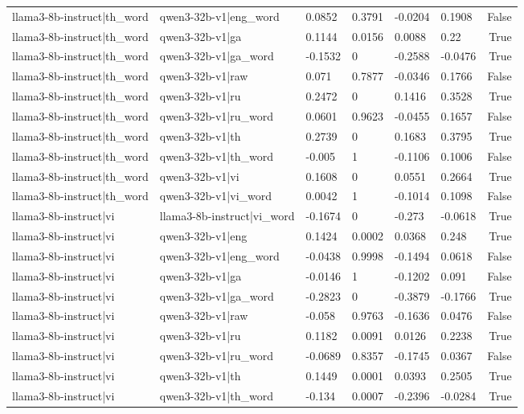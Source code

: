 \begin{table}
\begin{tabular}{llllllr}
llama3-8b-instruct|th_word & qwen3-32b-v1|eng_word & 0.0852 & 0.3791 & -0.0204 & 0.1908 & False \\
llama3-8b-instruct|th_word & qwen3-32b-v1|ga & 0.1144 & 0.0156 & 0.0088 & 0.22 & True \\
llama3-8b-instruct|th_word & qwen3-32b-v1|ga_word & -0.1532 & 0 & -0.2588 & -0.0476 & True \\
llama3-8b-instruct|th_word & qwen3-32b-v1|raw & 0.071 & 0.7877 & -0.0346 & 0.1766 & False \\
llama3-8b-instruct|th_word & qwen3-32b-v1|ru & 0.2472 & 0 & 0.1416 & 0.3528 & True \\
llama3-8b-instruct|th_word & qwen3-32b-v1|ru_word & 0.0601 & 0.9623 & -0.0455 & 0.1657 & False \\
llama3-8b-instruct|th_word & qwen3-32b-v1|th & 0.2739 & 0 & 0.1683 & 0.3795 & True \\
llama3-8b-instruct|th_word & qwen3-32b-v1|th_word & -0.005 & 1 & -0.1106 & 0.1006 & False \\
llama3-8b-instruct|th_word & qwen3-32b-v1|vi & 0.1608 & 0 & 0.0551 & 0.2664 & True \\
llama3-8b-instruct|th_word & qwen3-32b-v1|vi_word & 0.0042 & 1 & -0.1014 & 0.1098 & False \\
llama3-8b-instruct|vi & llama3-8b-instruct|vi_word & -0.1674 & 0 & -0.273 & -0.0618 & True \\
llama3-8b-instruct|vi & qwen3-32b-v1|eng & 0.1424 & 0.0002 & 0.0368 & 0.248 & True \\
llama3-8b-instruct|vi & qwen3-32b-v1|eng_word & -0.0438 & 0.9998 & -0.1494 & 0.0618 & False \\
llama3-8b-instruct|vi & qwen3-32b-v1|ga & -0.0146 & 1 & -0.1202 & 0.091 & False \\
llama3-8b-instruct|vi & qwen3-32b-v1|ga_word & -0.2823 & 0 & -0.3879 & -0.1766 & True \\
llama3-8b-instruct|vi & qwen3-32b-v1|raw & -0.058 & 0.9763 & -0.1636 & 0.0476 & False \\
llama3-8b-instruct|vi & qwen3-32b-v1|ru & 0.1182 & 0.0091 & 0.0126 & 0.2238 & True \\
llama3-8b-instruct|vi & qwen3-32b-v1|ru_word & -0.0689 & 0.8357 & -0.1745 & 0.0367 & False \\
llama3-8b-instruct|vi & qwen3-32b-v1|th & 0.1449 & 0.0001 & 0.0393 & 0.2505 & True \\
llama3-8b-instruct|vi & qwen3-32b-v1|th_word & -0.134 & 0.0007 & -0.2396 & -0.0284 & True \\

\end{tabular}
\end{table}
